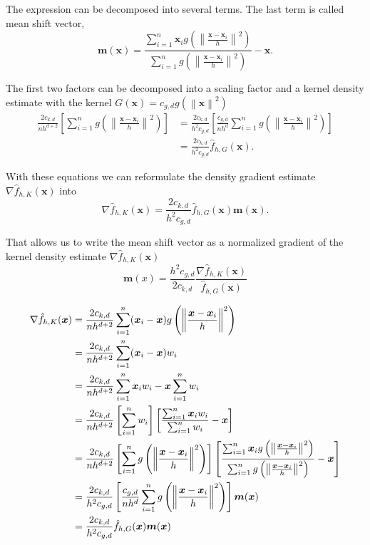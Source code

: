 \documentclass{article}
\newcommand{\norm}[1]{\left\lVert#1\right\rVert}
\begin{document}
The expression can be decomposed into several terms. The last term is called mean shift vector,
\begin{equation}
	\bm{m}(\bm{x}) = \frac{\sum_{i=1}^n \bm{x}_i g\left(\norm{\frac{\bm{x} - \bm{x}_i}{h}}^2 \right)}{\sum_{i=1}^n g\left(\norm{\frac{\bm{x} - \bm{x}_i}{h}}^2 \right)} - \bm{x}\text{.}
\end{equation}

The first two factors can be decomposed into a scaling factor and a kernel density estimate with the kernel $G(\bm{x}) = c_{g,d} g(\norm{\bm{x}}^2)$
\begin{align}
	\frac{2c_{k,d}}{nh^{d+2}} \left[\sum_{i=1}^n g\left(\norm{\frac{\bm{x} - \bm{x}_i}{h}}^2 \right)\right] &= \frac{2c_{k,d}}{h^2c_{g,d}} \left[\frac{c_{g,d}}{nh^d} \sum_{i=1}^n g\left(\norm{\frac{\bm{x} - \bm{x}_i}{h}}^2 \right) \right]\\
	&= \frac{2c_{k,d}}{h^2c_{g,d}} \hat{f}_{h,G}(\bm{x})\text{.}
\end{align}

With these equations we can reformulate the density gradient estimate $\nabla \hat{f}_{h,K}(\bm{x})$ into
\begin{equation}
	\nabla \hat{f}_{h,K}(\bm{x}) = \frac{2c_{k,d}}{h^2c_{g,d}} \hat{f}_{h,G}(\bm{x}) \bm{m}(\bm{x})\text{.}
\end{equation}

That allows us to write the mean shift vector as a normalized gradient of the kernel density estimate $\nabla \hat{f}_{h,K}(\bm{x})$
\begin{equation}
	\bm{m}(x) = \frac{h^2c_{g,d}}{2c_{k,d}} \frac{\nabla \hat{f}_{h,K}(\bm{x})}{\hat{f}_{h,G}(\bm{x})}
\end{equation}


\begin{align}
	\nabla \hat{f}_{h,K}(\bm{x}) &= \frac{2c_{k,d}}{nh^{d+2}} \sum_{i=1}^n (\bm{x}_i - \bm{x})g\left(\norm{\frac{\bm{x} - \bm{x}_i}{h}}^2 \right)\notag\\
	&= \frac{2c_{k,d}}{nh^{d+2}} \sum_{i=1}^n (\bm{x}_i - \bm{x}) w_i\notag\\
	&= \frac{2c_{k,d}}{nh^{d+2}} \sum_{i=1}^n \bm{x}_i w_i - \bm{x} \sum_{i=1}^n w_i\notag\\
	&= \frac{2c_{k,d}}{nh^{d+2}} \left[\sum_{i=1}^n w_i\right] \left[\frac{\sum_{i=1}^n \bm{x}_i w_i}{\sum_{i=1}^n w_i} - \bm{x}\right]\notag\\
	&= \frac{2c_{k,d}}{nh^{d+2}} \left[\sum_{i=1}^n g\left(\norm{\frac{\bm{x} - \bm{x}_i}{h}}^2 \right)\right] \left[\frac{\sum_{i=1}^n \bm{x}_i g\left(\norm{\frac{\bm{x} - \bm{x}_i}{h}}^2 \right)}{\sum_{i=1}^n g\left(\norm{\frac{\bm{x} - \bm{x}_i}{h}}^2 \right)} - \bm{x}\right]\notag\\
	&= \frac{2c_{k,d}}{h^2c_{g,d}} \left[\frac{c_{g,d}}{nh^d} \sum_{i=1}^n g\left(\norm{\frac{\bm{x} - \bm{x}_i}{h}}^2 \right) \right] \bm{m}(\bm{x})\notag\\
	&= \frac{2c_{k,d}}{h^2c_{g,d}} \hat{f}_{h,G}(\bm{x}) \bm{m}(\bm{x})\notag
\end{align}
\end{document}
